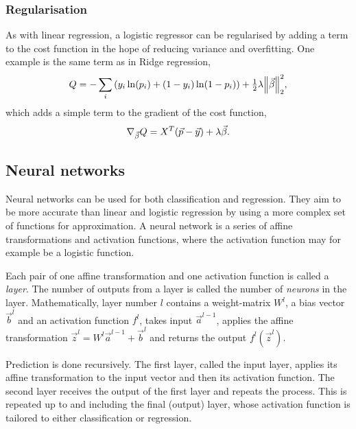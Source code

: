 \documentclass[11pt,british,a4paper]{article}
\numberwithin{equation}{section}
\begin{document}
\subsubsection{Regularisation}
As with linear regression, a logistic regressor can be regularised by adding a term to the cost function in the hope of reducing variance and overfitting.
One example is the same term as in Ridge regression,
\begin{equation}
    Q = - \sum_i \qty(y_i \ln(p_i) + (1-y_i)\ln(1-p_i)) + \tfrac{1}{2}\lambda \norm{\vec{\beta}}_2^2,
\end{equation}
which adds a simple term to the gradient of the cost function,
\begin{equation}
    \nabla_{\vec{\beta}} Q = X^T \qty(\vec{p} - \vec{y}) + \lambda \vec{\beta}.
\end{equation}


\subsection{Neural networks}
Neural networks can be used for both classification and regression.
They aim to be more accurate than linear and logistic regression by using a more complex set of functions for approximation.
A neural network is a series of affine transformations and activation functions, where the activation function may for example be a logistic function.

Each pair of one affine transformation and one activation function is called a \emph{layer}. The number of outputs from a layer is called the number of \emph{neurons} in the layer. Mathematically, layer number \(l\) contains a weight-matrix \(W^l\), a bias vector \(\vec{b}^l\) and an activation function \(f^l\), takes input \(\vec{a}^{l-1}\), applies the affine transformation \(\vec{z}^l = W^l \vec{a}^{l-1} + \vec{b}^l\) and returns the output \(f^l(\vec{z}^l)\).

Prediction is done recursively. The first layer, called the input layer, applies its affine transformation to the input vector and then its activation function. The second layer receives the output of the first layer and repeats the process. This is repeated up to and including the final (output) layer, whose activation function is tailored to either classification or regression.
\end{document}
